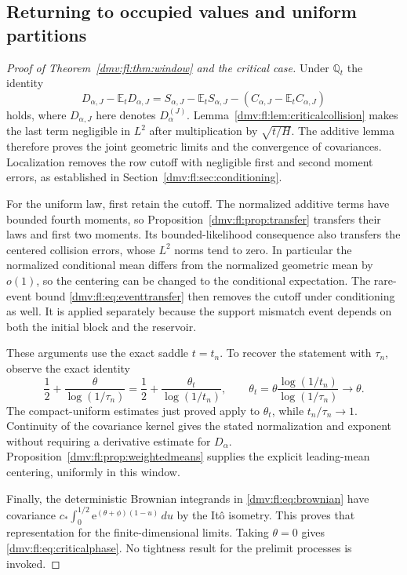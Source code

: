 \documentclass[11pt,letterpaper]{article}
\numberwithin{equation}{section}
\theoremstyle{definition}\newtheorem{definition}[theorem]{Definition}
\theoremstyle{remark}\newtheorem{remark}[theorem]{Remark}
\newcommand{\E}{\mathbb E}
\newcommand{\ee}{\mathrm e}
\newcommand{\Q}{\mathbb Q}
\begin{document}
\subsection{Returning to occupied values and uniform partitions}
\begin{proof}[Proof of Theorem~\ref{dmv:fl:thm:window} and the critical case]
Under $\Q_t$ the identity
\[
 D_{\alpha,J}-\E_tD_{\alpha,J}
 =S_{\alpha,J}-\E_tS_{\alpha,J}
       -(C_{\alpha,J}-\E_tC_{\alpha,J})
\]
holds, where $D_{\alpha,J}$ here denotes $D_\alpha^{(J)}$.
Lemma~\ref{dmv:fl:lem:criticalcollision} makes the last term negligible in
$L^2$ after multiplication by $\sqrt{t/H}$. The additive lemma therefore
proves the joint geometric limits and the convergence of covariances.
Localization removes the row cutoff with negligible first and second
moment errors, as established in Section~\ref{dmv:fl:sec:conditioning}.

For the uniform law, first retain the cutoff. The normalized additive
terms have bounded fourth moments, so Proposition~\ref{dmv:fl:prop:transfer}
transfers their laws and first two moments. Its bounded-likelihood
consequence also transfers the centered collision errors, whose $L^2$
norms tend to zero. In particular the normalized conditional mean
differs from the normalized geometric mean by $o(1)$, so the centering
can be changed to the conditional expectation. The rare-event bound
\eqref{dmv:fl:eq:eventtransfer} then removes the cutoff under
conditioning as well. It is applied separately because the support
mismatch event depends on both the initial block and the reservoir.

These arguments use the exact saddle $t=t_n$. To recover the statement
with $\tau_n$, observe the exact identity
\[
 \frac12+\frac\theta{\log(1/\tau_n)}
 =\frac12+\frac{\theta_t}{\log(1/t_n)},\qquad
 \theta_t=\theta\frac{\log(1/t_n)}{\log(1/\tau_n)}\longrightarrow\theta.
\]
The compact-uniform estimates just proved apply to $\theta_t$, while
$t_n/\tau_n\to1$. Continuity of the covariance kernel gives the stated
normalization and exponent without requiring a derivative estimate for
$D_\alpha$. Proposition~\ref{dmv:fl:prop:weightedmeans} supplies the explicit
leading-mean centering, uniformly in this window.

Finally, the deterministic Brownian integrands in \eqref{dmv:fl:eq:brownian}
have covariance
$c_*\int_0^{1/2}\ee^{(\theta+\phi)(1-u)}\,du$ by the It\^o isometry.
This proves that representation for the finite-dimensional limits.
Taking $\theta=0$ gives \eqref{dmv:fl:eq:criticalphase}. No tightness result
for the prelimit processes is invoked.
\end{proof}
\end{document}
